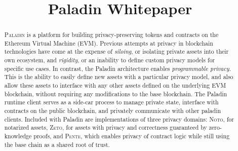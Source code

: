 \documentclass[conference,compsoc,onecolumn]{IEEEtran}
\date{}
\author{}
\begin{document}
\title{Paladin Whitepaper}

\maketitle


\begin{abstract}

\textsc{Paladin} is a platform for building privacy-preserving tokens and contracts on the Ethereum Virtual Machine (EVM). Previous attempts at privacy in blockchain technologies have come at the expense of \textit{siloing}, or isolating private assets into their own ecosystem, and \textit{rigidity}, or an inability to define custom privacy models for specific use cases. In contrast, the Paladin architecture enables \textit{programmable privacy}. This is the ability to easily define new assets with a particular privacy model, and also allow these assets to interface with any other assets defined on the underlying EVM blockchain, without requiring any modifications to the base blockchain. The Paladin runtime client serves as a side-car process to manage private state, interface with contracts on the public blockchain, and privately communicate with other paladin clients. Included with Paladin are implementations of three privacy domains: \textsc{Noto}, for notarized assets, \textsc{Zeto}, for assets with privacy and correctness guaranteed by zero-knowledge proofs, and \textsc{Pente}, which enables privacy of contract logic while still using the base chain as a shared root of trust.

\end{abstract}














\appendices
% 
\end{document}
